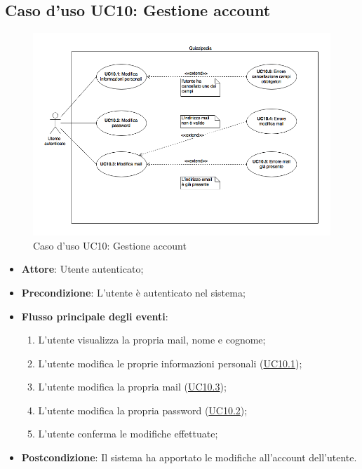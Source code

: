 \documentclass[12pt,a4paper]{article}
\begin{document}
\subsection{Caso d'uso UC10: Gestione account}
\begin{figure}[H]
    \centering
	\includegraphics[width=\textwidth]{diagramUC10.png}
	\caption{Caso d'uso UC10: Gestione account}\label{fig:UC10} 
\end{figure}
\begin{itemize}

\item \textbf{Attore}: Utente autenticato; 
\item \textbf{Precondizione}: L'utente è autenticato nel sistema;

\item \textbf{Flusso principale degli eventi}:
\begin{enumerate}
	\item L’utente visualizza la propria mail, nome e cognome;
	\item L’utente modifica le proprie informazioni personali (\hyperlink{UC10.1}{UC10.1});
	\item L’utente modifica la propria mail (\hyperlink{UC10.3}{UC10.3});
	\item L’utente modifica la propria password (\hyperlink{UC10.2}{UC10.2});
	\item L'utente conferma le modifiche effettuate;
	
\end{enumerate}
\item \textbf{Postcondizione}: Il sistema ha apportato le modifiche all'account dell'utente.
\end{itemize}
\hypertarget{UC10.1}{}
\end{document}
